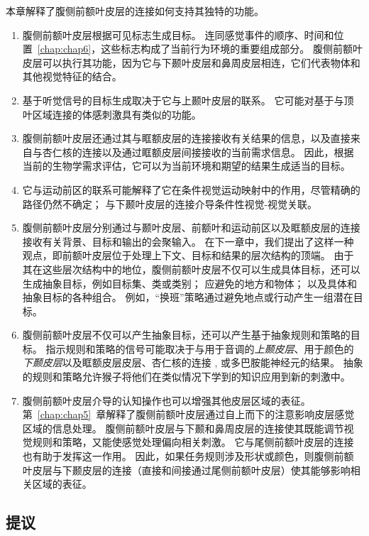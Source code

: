 本章解释了腹侧前额叶皮层的连接如何支持其独特的功能。


\begin{enumerate}
\item 腹侧前额叶皮层根据可见标志生成目标。 
连同感觉事件的顺序、时间和位置~\ref{chap:chap6}，这些标志构成了当前行为环境的重要组成部分。
腹侧前额叶皮层可以执行其功能，因为它与下颞叶皮层和鼻周皮层相连，它们代表物体和其他视觉特征的结合。
\item 基于听觉信号的目标生成取决于它与上颞叶皮层的联系。
它可能对基于与顶叶区域连接的体感刺激具有类似的功能。
\item 腹侧前额叶皮层还通过其与眶额皮层的连接接收有关结果的信息，以及直接来自与杏仁核的连接以及通过眶额皮层间接接收的当前需求信息。
因此，根据当前的生物学需求评估，它可以为当前环境和期望的结果生成适当的目标。
\item 它与运动前区的联系可能解释了它在条件视觉运动映射中的作用，尽管精确的路径仍然不确定；
与下颞叶皮层的连接介导条件性视觉-视觉关联。
\item 腹侧前额叶皮层分别通过与颞叶皮层、前额叶和运动前区以及眶额皮层的连接接收有关背景、目标和输出的会聚输入。
在下一章中，我们提出了这样一种观点，即前额叶皮层位于处理上下文、目标和结果的层次结构的顶端。
由于其在这些层次结构中的地位，腹侧前额叶皮层不仅可以生成具体目标，还可以生成抽象目标，例如目标集、类或类别； 应避免的地方和物体； 以及具体和抽象目标的各种组合。
例如，“换班”策略通过避免地点或行动产生一组潜在目标。
\item 腹侧前额叶皮层不仅可以产生抽象目标，还可以产生基于抽象规则和策略的目标。 
指示规则和策略的信号可能取决于与用于音调的\textit{上颞皮层}\cite{wallis2001single}、用于颜色的\textit{下颞皮层}\cite{tsujimoto2010evaluating}以及眶额皮层皮层、杏仁核的连接 , 或多巴胺能神经元的结果。
抽象的规则和策略允许猴子将他们在类似情况下学到的知识应用到新的刺激中。
\item 腹侧前额叶皮层介导的认知操作也可以增强其他皮层区域的表征。
第~\ref{chap:chap5}~章解释了腹侧前额叶皮层通过自上而下的注意影响皮层感觉区域的信息处理。
腹侧前额叶皮层与下颞和鼻周皮层的连接使其既能调节视觉规则和策略，又能使感觉处理偏向相关刺激。
它与尾侧前额叶皮层的连接也有助于发挥这一作用。
因此，如果任务规则涉及形状或颜色，则腹侧前额叶皮层与下颞皮层的连接（直接和间接通过尾侧前额叶皮层）使其能够影响相关区域的表征。
\end{enumerate}




\subsection{提议}
\par

